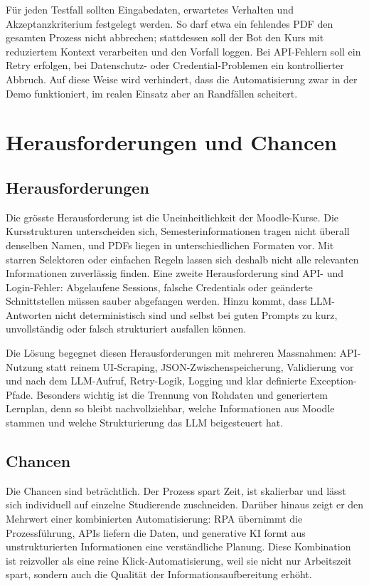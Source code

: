 \documentclass[11pt]{scrartcl}
\begin{document}
Für jeden Testfall sollten Eingabedaten, erwartetes Verhalten und Akzeptanzkriterium festgelegt werden. So darf etwa ein fehlendes PDF den gesamten Prozess nicht abbrechen; stattdessen soll der Bot den Kurs mit reduziertem Kontext verarbeiten und den Vorfall loggen. Bei API-Fehlern soll ein Retry erfolgen, bei Datenschutz- oder Credential-Problemen ein kontrollierter Abbruch. Auf diese Weise wird verhindert, dass die Automatisierung zwar in der Demo funktioniert, im realen Einsatz aber an Randfällen scheitert.

\section{Herausforderungen und Chancen}
\subsection{Herausforderungen}
Die grösste Herausforderung ist die Uneinheitlichkeit der Moodle-Kurse. Die Kursstrukturen unterscheiden sich, Semesterinformationen tragen nicht überall denselben Namen, und PDFs liegen in unterschiedlichen Formaten vor. Mit starren Selektoren oder einfachen Regeln lassen sich deshalb nicht alle relevanten Informationen zuverlässig finden. Eine zweite Herausforderung sind API- und Login-Fehler: Abgelaufene Sessions, falsche Credentials oder geänderte Schnittstellen müssen sauber abgefangen werden. Hinzu kommt, dass LLM-Antworten nicht deterministisch sind und selbst bei guten Prompts zu kurz, unvollständig oder falsch strukturiert ausfallen können.

Die Lösung begegnet diesen Herausforderungen mit mehreren Massnahmen: API-Nutzung statt reinem UI-Scraping, JSON-Zwischenspeicherung, Validierung vor und nach dem LLM-Aufruf, Retry-Logik, Logging und klar definierte Exception-Pfade. Besonders wichtig ist die Trennung von Rohdaten und generiertem Lernplan, denn so bleibt nachvollziehbar, welche Informationen aus Moodle stammen und welche Strukturierung das LLM beigesteuert hat.

\subsection{Chancen}
Die Chancen sind beträchtlich. Der Prozess spart Zeit, ist skalierbar und lässt sich individuell auf einzelne Studierende zuschneiden. Darüber hinaus zeigt er den Mehrwert einer kombinierten Automatisierung: RPA übernimmt die Prozessführung, APIs liefern die Daten, und generative KI formt aus unstrukturierten Informationen eine verständliche Planung. Diese Kombination ist reizvoller als eine reine Klick-Automatisierung, weil sie nicht nur Arbeitszeit spart, sondern auch die Qualität der Informationsaufbereitung erhöht.
\end{document}
